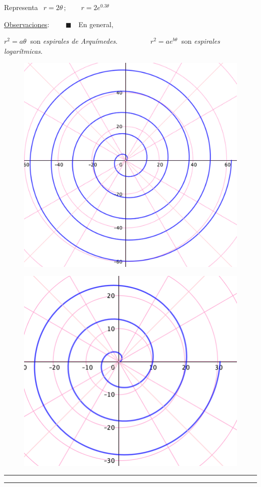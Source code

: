 \vspace{5mm}
\begin{mipropuesto}

Representa $\ \ r=2\theta\, ; \qquad r=2e^{0.3\theta}$
\end{mipropuesto}


\underline{Observaciones}: 
\tiny{$\qquad \blacksquare \quad $}\normalsize{En} general, 

\hspace{10mm}$r^2=a \theta \ $ son \emph{espirales de Arquímedes}.
$\qquad \qquad$
\hspace{10mm}$r^2=a e^{b \theta} \ $ son \emph{espirales logarítmicas}.

\begin{multicols}{2}
\begin{figure}[H]
	\centering
	\includegraphics[width=.3\textwidth]{img-polares/polares51.png}
\end{figure}
\begin{figure}[H]
	\centering
	\includegraphics[width=.3\textwidth]{img-polares/polares52.png}
\end{figure}
\end{multicols}

\begin{flushright}\textcolor{teal}{\rule{250pt}{0.2pt}}	\end{flushright}	

\color{teal}
\rule{250pt}{0.2pt}

